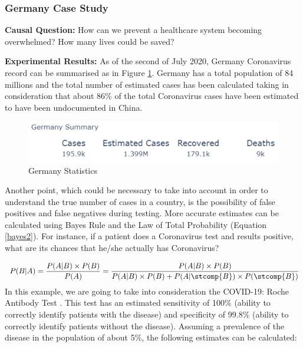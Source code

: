 \subsubsection{Germany Case Study}

\textbf{Causal Question:} How can we prevent a healthcare system becoming overwhelmed? How many lives could be saved?

\textbf{Experimental Results:} As of the second of July 2020, Germany Coronavirus record can be summarised as in Figure \ref{germ}. Germany has a total population of 84 millions and the total number of estimated cases has been calculated taking in consideration that about 86\% of the total Coronavirus cases have been estimated to have been undocumented \cite{cases_paper} in China.

\begin{figure}[ht!]%
    \centering
    \includegraphics[width=0.85\linewidth]{latex/images/cov_g.pdf}
    \vspace{-0.2cm}
    \caption{Germany Statistics}
    \label{germ}
    \vspace{-0.2cm}
\end{figure}
\vspace{-0.5cm}
Another point, which could be necessary to take into account in order to understand the true number of cases in a country, is the possibility of false positives and false negatives during testing. More accurate estimates can be calculated using Bayes Rule and the Law of Total Probability (Equation \ref{bayes2}). For instance, if a patient does a Coronavirus test and results positive, what are its chances that he/she actually has Coronavirus?

\useshortskip
\begin{align}
\ P(B|A) = \frac{P(A|B)\times P(B)}{P(A)} = \frac{P(A|B)\times P(B)}{P(A|B)\times P(B) + P(A|\stcomp{B})\times P(\stcomp{B})}
\label{bayes2}
\end{align}
\useshortskip
In this example, we are going to take into consideration the COVID-19: Roche Antibody Test \cite{roche}. This test has an estimated sensitivity of 100\% (ability to correctly identify patients with the disease) and specificity of 99.8\% (ability to correctly identify patients without the disease). Assuming a prevalence of the disease in the population of about 5\%, the following estimates can be calculated:


